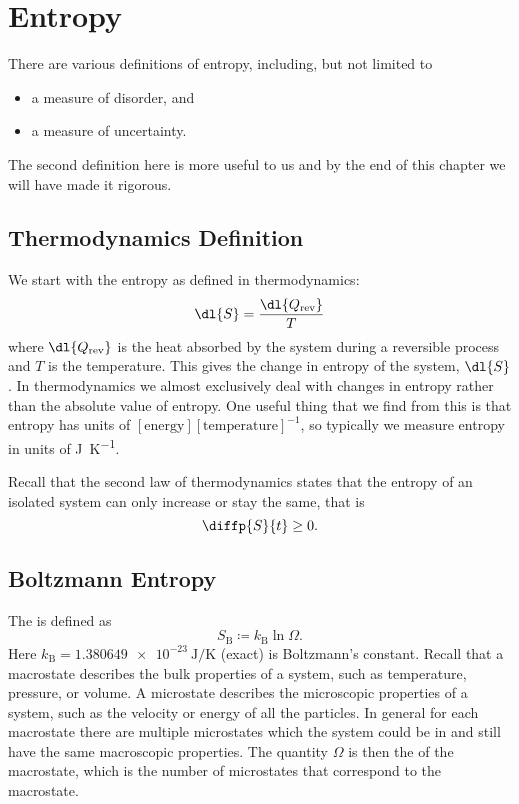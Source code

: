 \documentclass[fleqn]{NotesClass}
\newcommand*{\boltzmann}{k_{\mathrm{B}}}
\begin{document}
    \section{Entropy}
    There are various definitions of entropy, including, but not limited to
    \begin{itemize}
        \item a measure of disorder, and
        \item a measure of uncertainty.
    \end{itemize}
    The second definition here is more useful to us and by the end of this chapter we will have made it rigorous.
    
    \subsection{Thermodynamics Definition}
    We start with the entropy as defined in thermodynamics:
    \begin{equation}
        \dl{S} = \frac{\dl{Q_{\mathrm{rev}}}}{T}
    \end{equation}
    where \(\dl{Q_{\mathrm{rev}}}\) is the heat absorbed by the system during a reversible process and \(T\) is the temperature.
    This gives the change in entropy of the system, \(\dl{S}\).
    In thermodynamics we almost exclusively deal with changes in entropy rather than the absolute value of entropy.
    One useful thing that we find from this is that entropy has units of \([\mathrm{energy}][\mathrm{temperature}]^{-1}\), so typically we measure entropy in units of \unit{\joule\per\kelvin}.
    
    Recall that the second law of thermodynamics states that the entropy of an isolated system can only increase or stay the same, that is
    \begin{equation}
        \diffp{S}{t} \ge 0.
    \end{equation}
    
    \subsection{Boltzmann Entropy}
    The  is defined as
    \begin{equation}
        S_{\mathrm{B}} \coloneqq \boltzmann \ln \Omega.
    \end{equation}
    Here \(\boltzmann = \qty{1.380649e-23}{\joule\per\kelvin}\)\index{kB@\(\boltzmann\), Boltzmann's constant} (exact) is Boltzmann's constant.
    Recall that a macrostate describes the bulk properties of a system, such as temperature, pressure, or volume.
    A microstate describes the microscopic properties of a system, such as the velocity or energy of all the particles.
    In general for each macrostate there are multiple microstates which the system could be in and still have the same macroscopic properties.
    The quantity \(\Omega\) is then the  of the macrostate, which is the number of microstates that correspond to the macrostate.
    
\end{document}
